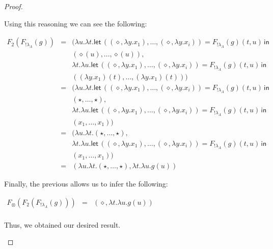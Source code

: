 \begin{proof}
\begin{center}
\begin{itemize}
      Using this reasoning we can see the following:
      \begin{center}
        \begin{math}
          \begin{array}{lll}
            F_2(F_{!\lambda_A}(g))
            & = & (\lambda u.\lambda t.\mathsf{let}\,((\diamond,\lambda y.x_1),\ldots,(\diamond,\lambda y.x_i)) = F_{!\lambda_A}(g)(t,u)\,\mathsf{in}\,\\
                  & & (\diamond(u),\ldots,\diamond(u)),\\            
            & & \lambda t.\lambda u.\mathsf{let}\,((\diamond,\lambda y.x_1),\ldots,(\diamond,\lambda y.x_i)) = F_{!\lambda_A}(g)(t,u)
                \,\mathsf{in}\, \\
            & & ((\lambda y.x_1)(t),\ldots,(\lambda y.x_1)(t)))\\
            & = & (\lambda u.\lambda t.\mathsf{let}\,((\diamond,\lambda y.x_1),\ldots,(\diamond,\lambda y.x_i)) = F_{!\lambda_A}(g)(t,u)\,\mathsf{in}\,\\
            & & (\star,\ldots,\star),\\            
            & & \lambda t.\lambda u.\mathsf{let}\,((\diamond,\lambda y.x_1),\ldots,(\diamond,\lambda y.x_i)) = F_{!\lambda_A}(g)(t,u)
                \,\mathsf{in}\, \\
            & & (x_1,\ldots,x_1))\\
            & = & (\lambda u.\lambda t.(\star,\ldots,\star),\\            
            & & \lambda t.\lambda u.\mathsf{let}\,((\diamond,\lambda y.x_1),\ldots,(\diamond,\lambda y.x_i)) = F_{!\lambda_A}(g)(t,u)
                \,\mathsf{in}\, \\
            & & (x_1,\ldots,x_1))\\
            & = & (\lambda u.\lambda t.(\star,\ldots,\star), \lambda t.\lambda u.g(u))
          \end{array}
        \end{math}
      \end{center}
      Finally, the previous allows us to infer the following:
      \begin{center}
        \begin{math}
          \begin{array}{lll}
            F_\otimes(F_2(F_{!\lambda_A}(g)))
            & = & (\diamond, \lambda t.\lambda u.g(u))\\
          \end{array}
        \end{math}
      \end{center}
      Thus, we obtained our desired result.

      
    \end{itemize}    
  \end{center}
  
\end{proof}

